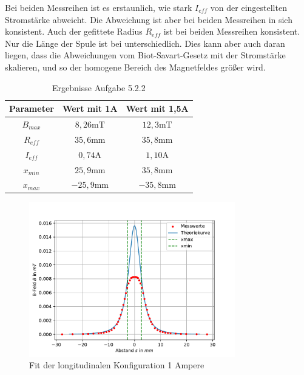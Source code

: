 \documentclass[11pt, a4paper]{article}
\begin{document}
    Bei beiden Messreihen ist es erstaunlich, wie stark $I_{eff}$ von der eingestellten Stromstärke abweicht. Die Abweichung ist aber bei beiden Messreihen in sich konsistent. Auch der gefittete Radius $R_{eff}$ ist bei beiden Messreihen konsistent. Nur die Länge der Spule ist bei unterschiedlich. Dies kann aber auch daran liegen, dass die Abweichungen vom Biot-Savart-Gesetz mit der Stromstärke skalieren, und so der homogene Bereich des Magnetfeldes größer wird.
    \begin{table}[h]
        \centering
        \begin{tabular}{c | c | c}
            \textbf{Parameter} & \textbf{Wert mit 1A} & \textbf{Wert mit 1,5A} \\
            \hline
            $B_{max}$ & $8,26 \si{\milli\tesla}$ & $12,3 \si{\milli\tesla}$ \\
            $R_{eff}$ & $35,6 \si{\milli\metre}$ & $35,8 \si{\milli\metre}$ \\
            $I_{eff}$ & $0,74 \si{\ampere}$ & $1,10 \si{\ampere}$ \\
            $x_{min}$ & $25,9 \si{\milli\meter}$ & $35,8 \si{\milli\meter}$ \\
            $x_{max}$ & $-25,9 \si{\milli\meter}$ & $-35,8 \si{\milli\meter}$ \\
        \end{tabular}
        \caption{Ergebnisse Aufgabe 5.2.2}
        \label{tab:fit}
    \end{table}

    \begin{figure}
        \centering
        \includegraphics[width=0.8\textwidth]{fit1.pdf}
        \caption{Fit der longitudinalen Konfiguration 1 Ampere}
        \label{fig:longfit1a}
    \end{figure}
\end{document}
